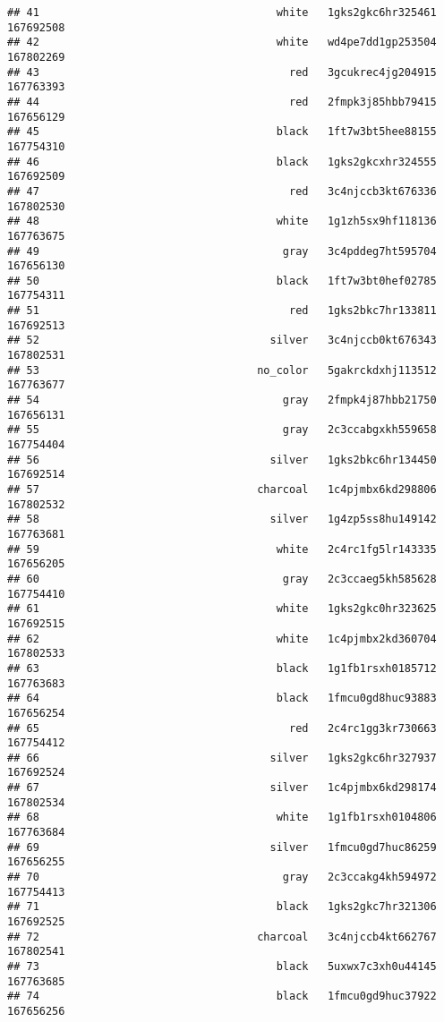 \documentclass[
]{article}
\begin{document}
\begin{verbatim}
## 41                                     white   1gks2gkc6hr325461 167692508
## 42                                     white   wd4pe7dd1gp253504 167802269
## 43                                       red   3gcukrec4jg204915 167763393
## 44                                       red   2fmpk3j85hbb79415 167656129
## 45                                     black   1ft7w3bt5hee88155 167754310
## 46                                     black   1gks2gkcxhr324555 167692509
## 47                                       red   3c4njccb3kt676336 167802530
## 48                                     white   1g1zh5sx9hf118136 167763675
## 49                                      gray   3c4pddeg7ht595704 167656130
## 50                                     black   1ft7w3bt0hef02785 167754311
## 51                                       red   1gks2bkc7hr133811 167692513
## 52                                    silver   3c4njccb0kt676343 167802531
## 53                                  no_color   5gakrckdxhj113512 167763677
## 54                                      gray   2fmpk4j87hbb21750 167656131
## 55                                      gray   2c3ccabgxkh559658 167754404
## 56                                    silver   1gks2bkc6hr134450 167692514
## 57                                  charcoal   1c4pjmbx6kd298806 167802532
## 58                                    silver   1g4zp5ss8hu149142 167763681
## 59                                     white   2c4rc1fg5lr143335 167656205
## 60                                      gray   2c3ccaeg5kh585628 167754410
## 61                                     white   1gks2gkc0hr323625 167692515
## 62                                     white   1c4pjmbx2kd360704 167802533
## 63                                     black   1g1fb1rsxh0185712 167763683
## 64                                     black   1fmcu0gd8huc93883 167656254
## 65                                       red   2c4rc1gg3kr730663 167754412
## 66                                    silver   1gks2gkc6hr327937 167692524
## 67                                    silver   1c4pjmbx6kd298174 167802534
## 68                                     white   1g1fb1rsxh0104806 167763684
## 69                                    silver   1fmcu0gd7huc86259 167656255
## 70                                      gray   2c3ccakg4kh594972 167754413
## 71                                     black   1gks2gkc7hr321306 167692525
## 72                                  charcoal   3c4njccb4kt662767 167802541
## 73                                     black   5uxwx7c3xh0u44145 167763685
## 74                                     black   1fmcu0gd9huc37922 167656256

\end{verbatim}
\end{document}
